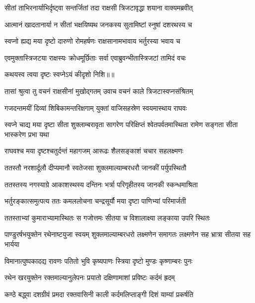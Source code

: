 \twolineshloka
{सीतां ताभिरनार्याभिर्दृष्ट्वा सन्तर्जितां तदा}
{राक्षसी त्रिजटावृद्धा शयाना वाक्यमब्रवीत्} %

\twolineshloka
{आत्मानं खादतानार्या न सीतां भक्षयिष्यथ}
{जनकस्य सुतामिष्टां स्नुषां दशरथस्य च} %

\twolineshloka
{स्वप्नो ह्यद्य मया दृष्टो दारुणो रोमहर्षणः}
{राक्षसानामभावाय भर्तुरस्या भवाय च} %

\twolineshloka
{एवमुक्तास्त्रिजटया राक्षस्यः क्रोधमूर्छिताः}
{सर्वा एवाब्रुवन्भीतास्त्रिजटां तामिदं वचः} %

{कथयस्व त्वया दृष्टः स्वप्नेऽयं कीदृशो निशि॥॥} %

\addtocounter{shlokacount}{1}

\twolineshloka
{तासां श्रुत्वा तु वचनं राक्षसीनां मुखोद्गतम्}
{उवाच वचनं काले त्रिजटास्वप्नसंश्रितम्} %

\twolineshloka
{गजदन्तमयीं दिव्यां शिबिकामन्तरिक्षगाम्}
{युक्तां वाजिसहस्रेण स्वयमास्थाय राघवः} %

\threelineshloka
{स्वप्ने चाद्य मया दृष्टा सीता शुक्लाम्बरावृता}
{सागरेण परिक्षिप्तं श्वेतपर्वतमास्थिता}
{रामेण सङ्गता सीता भास्करेण प्रभा यथा} %

\twolineshloka
{राघवश्च मया दृष्टश्चतुर्दन्तं महागजम्}
{आरूढः शैलसङ्काशं चचार सहलक्ष्मणः} %

\twolineshloka
{ततस्तौ नरशार्दूलौ दीप्यमानौ स्वतेजसा}
{शुक्लमाल्याम्बरधरौ जानकीं पर्युपस्थितौ} %

\twolineshloka
{ततस्तस्य नगस्याग्रे आकाशस्थस्य दन्तिनः}
{भर्त्रा परिगृहीतस्य जानकी स्कन्धमाश्रिता} %

\twolineshloka
{भर्तुरङ्कात्समुत्पत्य ततः कमललोचना}
{चन्द्रसूर्यौ मया दृष्टा पाणिभ्यां परिमार्जती} %

\twolineshloka
{ततस्ताभ्यां कुमाराभ्यामास्थितः स गजोत्तमः}
{सीतया च विशालाक्ष्या लङ्काया उपरि स्थितः} %

\threelineshloka
{पाण्डुरर्षभयुक्तेन रथेनाष्टयुजा स्वयम्}
{शुक्लमाल्याम्बरधरो लक्ष्मणेन समागतः}
{लक्ष्मणेन सह भ्रात्रा सीतया सह भार्यया} %

\twolineshloka
{विमानात्पुष्पकादद्य रावणः पतितो भुवि}
{कृष्यपाणः स्त्रिया दृष्टो मुण्डः कृष्णाम्बरः पुनः} %

\twolineshloka
{रथेन खरयुक्तेन रक्तमाल्यानुलेपनः}
{प्रयातो दक्षिणामाशां प्रविष्टः कर्दमं ह्रदम्} %

\twolineshloka
{कण्ठे बद्ध्वा दशग्रीवं प्रमदा रक्तवासिनी}
{काली कर्दमलिप्ताङ्गी दिशं याम्यां प्रकर्षति} %

